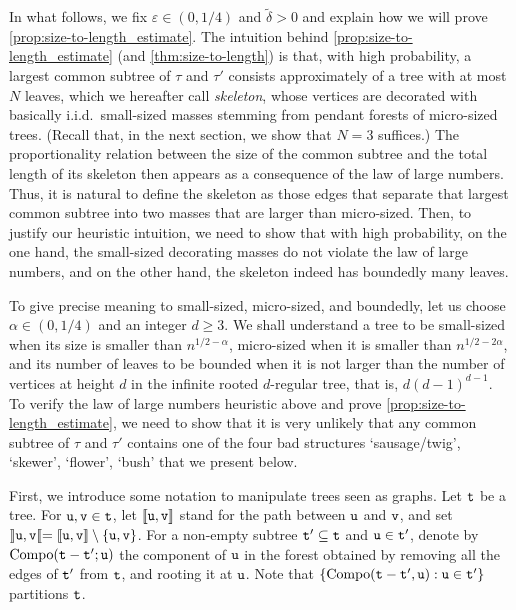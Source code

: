 \documentclass[11pt,reqno]{amsart}
\begin{document}
In what follows, we fix $\varepsilon\in (0,1/4)$ and $\tilde{\delta}>0$ and explain how we will prove \cref{prop:size-to-length_estimate}. The intuition behind \cref{prop:size-to-length_estimate} (and \cref{thm:size-to-length}) is that, with high probability, a largest common subtree of $\tau$ and $\tau'$ consists approximately of a tree with at most $N$ leaves, which we hereafter call \emph{skeleton}, whose vertices are decorated with basically i.i.d.~small-sized masses stemming from pendant forests of micro-sized trees. (Recall that, in the next section, we show that $N=3$ suffices.) The proportionality relation between the size of the common subtree and the total length of its skeleton then appears as a consequence of the law of large numbers. Thus, it is natural to define the skeleton as those edges that separate that largest common subtree into two masses that are larger than micro-sized. Then, to justify our heuristic intuition, we need to show that with high probability, on the one hand, the small-sized decorating masses do not violate the law of large numbers, and on the other hand, the skeleton indeed has boundedly many leaves.
\smallskip

To give precise meaning to small-sized, micro-sized, and boundedly, let us choose $\alpha\in(0,1/4)$ and an integer $d\geq 3$. We shall understand a tree to be small-sized when its size is smaller than $n^{1/2-\alpha}$, micro-sized when it is smaller than $n^{1/2-2\alpha}$, and its number of leaves to be bounded when it is not larger than the number of vertices at height $d$ in the infinite rooted $d$-regular tree, that is, $d(d-1)^{d-1}$. To verify the law of large numbers heuristic above and prove \cref{prop:size-to-length_estimate}, we need to show that it is very unlikely that any common subtree of $\tau$ and $\tau'$ contains one of the four bad structures `sausage/twig', `skewer', `flower', `bush' that we present below.
\smallskip

First, we introduce some notation to manipulate trees seen as graphs. Let $\mathtt{t}$ be a tree. For $\mathtt{u},\mathtt{v}\in\mathtt{t}$, let $\llbracket \mathtt{u},\mathtt{v}\rrbracket$ stand for the path between $\mathtt{u}$ and $\mathtt{v}$, and set $\rrbracket \mathtt{u},\mathtt{v}\llbracket=\llbracket \mathtt{u},\mathtt{v}\rrbracket\setminus\{\mathtt{u},\mathtt{v}\}$. For a non-empty subtree $\mathtt{t}'\subseteq \mathtt{t}$ and $\mathtt{u}\in\mathtt{t}'$, denote by $\mathrm{Compo}(\mathtt{t}-\mathtt{t}';\mathtt{u})$ the component of $\mathtt{u}$ in the forest obtained by removing all the edges of $\mathtt{t}'$ from $\mathtt{t}$, and rooting it at $\mathtt{u}$. Note that $\{ \mathrm{Compo}(\mathtt{t}-\mathtt{t}',\mathtt{u}) : \mathtt{u}\in\mathtt{t}' \}$ partitions $\mathtt{t}$.
\smallskip
\end{document}
